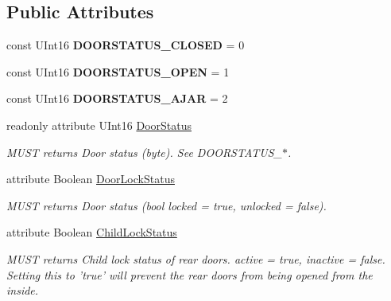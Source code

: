 \subsection*{Public Attributes}
\begin{DoxyCompactItemize}
\item 
\hypertarget{interfaceVehicle_1_1org_1_1automotive_1_1DoorStatus_aa180d72224864738e37782c3228691c4}{const U\-Int16 {\bfseries D\-O\-O\-R\-S\-T\-A\-T\-U\-S\-\_\-\-C\-L\-O\-S\-E\-D} = 0}\label{interfaceVehicle_1_1org_1_1automotive_1_1DoorStatus_aa180d72224864738e37782c3228691c4}

\item 
\hypertarget{interfaceVehicle_1_1org_1_1automotive_1_1DoorStatus_ad2bce616fb0872655b3503cbb1426e0d}{const U\-Int16 {\bfseries D\-O\-O\-R\-S\-T\-A\-T\-U\-S\-\_\-\-O\-P\-E\-N} = 1}\label{interfaceVehicle_1_1org_1_1automotive_1_1DoorStatus_ad2bce616fb0872655b3503cbb1426e0d}

\item 
\hypertarget{interfaceVehicle_1_1org_1_1automotive_1_1DoorStatus_a5bea88b5fe03e4ddc19036faeee112e3}{const U\-Int16 {\bfseries D\-O\-O\-R\-S\-T\-A\-T\-U\-S\-\_\-\-A\-J\-A\-R} = 2}\label{interfaceVehicle_1_1org_1_1automotive_1_1DoorStatus_a5bea88b5fe03e4ddc19036faeee112e3}

\item 
readonly attribute U\-Int16 \hyperlink{interfaceVehicle_1_1org_1_1automotive_1_1DoorStatus_a9df11347f9dc6b16d7be1ba632fc466d}{Door\-Status}
\begin{DoxyCompactList}\small\item\em M\-U\-S\-T returns Door status (byte). See D\-O\-O\-R\-S\-T\-A\-T\-U\-S\-\_\-$\ast$. \end{DoxyCompactList}\item 
attribute Boolean \hyperlink{interfaceVehicle_1_1org_1_1automotive_1_1DoorStatus_a92f3230d4fc471eab8541be36324e902}{Door\-Lock\-Status}
\begin{DoxyCompactList}\small\item\em M\-U\-S\-T returns Door status (bool locked = true, unlocked = false). \end{DoxyCompactList}\item 
attribute Boolean \hyperlink{interfaceVehicle_1_1org_1_1automotive_1_1DoorStatus_a682f1828dfa219ae0ba18d54029ea6ff}{Child\-Lock\-Status}
\begin{DoxyCompactList}\small\item\em M\-U\-S\-T returns Child lock status of rear doors. active = true, inactive = false. Setting this to 'true' will prevent the rear doors from being opened from the inside. \end{DoxyCompactList}\end{DoxyCompactItemize}



